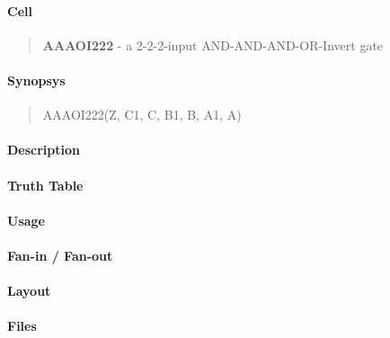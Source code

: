 \label{AAAOI222}
\paragraph{Cell}
\begin{quote}
    \textbf{AAAOI222} - a 2-2-2-input AND-AND-AND-OR-Invert gate
\end{quote}

\paragraph{Synopsys}
\begin{quote}
    AAAOI222(Z, C1, C, B1, B, A1, A)
\end{quote}

\paragraph{Description}



\paragraph{Truth Table}


\paragraph{Usage}

\paragraph{Fan-in / Fan-out}

\paragraph{Layout}

\paragraph{Files}
